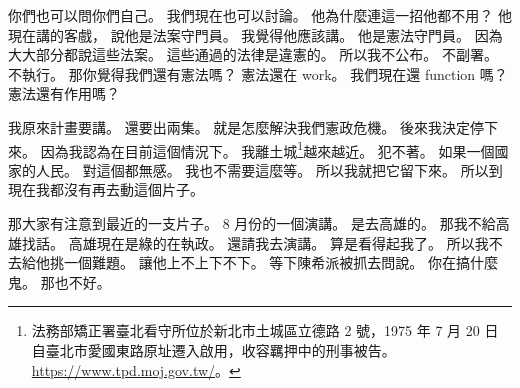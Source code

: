 \hypertarget{w01:cue:1403}{}你們也可以問你們自己。
\hypertarget{w01:cue:1404}{}我們現在也可以討論。
\hypertarget{w01:cue:1405}{}他為什麼連這一招他都不用？
\hypertarget{w01:cue:1406}{}他現在講的客戲，
\hypertarget{w01:cue:1407}{}說他是法案守門員。
\hypertarget{w01:cue:1408}{}我覺得他應該講。
\hypertarget{w01:cue:1409}{}他是憲法守門員。
\hypertarget{w01:cue:1410}{}因為大大部分都說這些法案。
\hypertarget{w01:cue:1411}{}這些通過的法律是違憲的。
\hypertarget{w01:cue:1412}{}所以我不公布。
\hypertarget{w01:cue:1413}{}不副署。
\hypertarget{w01:cue:1414}{}不執行。
\hypertarget{w01:cue:1415}{}那你覺得我們還有憲法嗎？
\hypertarget{w01:cue:1416}{}憲法還在 work。
\hypertarget{w01:cue:1417}{}我們現在還 function 嗎？
\hypertarget{w01:cue:1418}{}憲法還有作用嗎？

\hypertarget{w01:cue:1419}{}我原來計畫要講。
\hypertarget{w01:cue:1420}{}還要出兩集。
\hypertarget{w01:cue:1421}{}就是怎麼解決我們憲政危機。
\hypertarget{w01:cue:1422}{}後來我決定停下來。
\hypertarget{w01:cue:1423}{}因為我認為在目前這個情況下。
\hypertarget{w01:cue:1424}{}我離土城\footnote{法務部矯正署臺北看守所位於新北市土城區立德路 2 號，1975 年 7 月 20 日自臺北市愛國東路原址遷入啟用，收容羈押中的刑事被告。\url{https://www.tpd.moj.gov.tw/}。}越來越近。
\hypertarget{w01:cue:1425}{}犯不著。
\hypertarget{w01:cue:1426}{}如果一個國家的人民。
\hypertarget{w01:cue:1427}{}對這個都無感。
\hypertarget{w01:cue:1428}{}我也不需要這麼等。
\hypertarget{w01:cue:1429}{}所以我就把它留下來。
\hypertarget{w01:cue:1430}{}所以到現在我都沒有再去動這個片子。

\hypertarget{w01:cue:1431}{}那大家有注意到最近的一支片子。
\hypertarget{w01:cue:1432}{}8 月份的一個演講。
\hypertarget{w01:cue:1433}{}是去高雄的。
\hypertarget{w01:cue:1434}{}那我不給高雄找話。
\hypertarget{w01:cue:1435}{}高雄現在是綠的在執政。
\hypertarget{w01:cue:1436}{}還請我去演講。
\hypertarget{w01:cue:1437}{}算是看得起我了。
\hypertarget{w01:cue:1438}{}所以我不去給他挑一個難題。
\hypertarget{w01:cue:1439}{}讓他上不上下不下。
\hypertarget{w01:cue:1440}{}等下陳希派被抓去問說。
\hypertarget{w01:cue:1441}{}你在搞什麼鬼。
\hypertarget{w01:cue:1442}{}那也不好。

